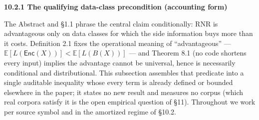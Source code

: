\documentclass[
]{article}
\begin{document}
\textbf{10.2.1 The qualifying data-class precondition (accounting form)}

The Abstract and §1.1 phrase the central claim conditionally: RNR is
advantageous only on data classes for which the side information buys
more than it costs. Definition 2.1 fixes the operational meaning of
``advantageous'' --- $\mathbb{E}[L(\mathsf{Enc}(X))] <
\mathbb{E}[L(B(X))]$ --- and Theorem 8.1 (no code shortens every input)
implies the advantage cannot be universal, hence is necessarily
conditional and distributional. This subsection assembles that
predicate into a single auditable inequality whose every term is
already defined or bounded elsewhere in the paper; it states no new
result and measures no corpus (which real corpora satisfy it is the
open empirical question of §11). Throughout we work per source symbol
and in the amortized regime of §10.2.
\end{document}
